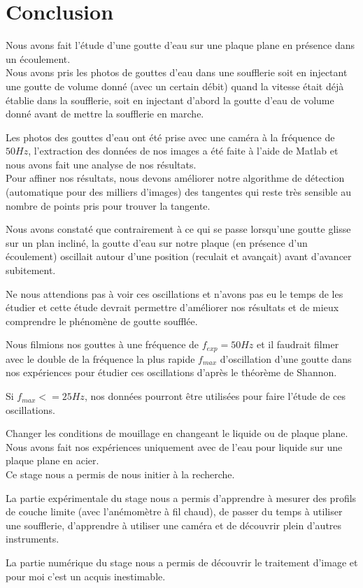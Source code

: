\section*{Conclusion}

Nous avons fait l'étude d'une goutte d'eau sur une plaque plane en présence dans un écoulement.\\

Nous avons pris les photos de gouttes d'eau dans une soufflerie soit en injectant une goutte de volume donné (avec un certain débit) quand la vitesse était déjà établie dans la soufflerie, soit en injectant d'abord la goutte d'eau de volume donné avant de mettre la soufflerie en marche.

Les photos des gouttes d'eau ont été prise avec une caméra à la fréquence de $50Hz$, l'extraction des données de nos images a été faite à l'aide de Matlab et nous avons fait une analyse de nos résultats.\\


Pour affiner nos résultats, nous devons améliorer notre algorithme de détection (automatique pour des milliers d'images) des tangentes qui reste très sensible au nombre de points pris pour trouver la tangente.

Nous avons constaté que contrairement à ce qui se passe lorsqu'une goutte glisse sur un plan incliné, 
la goutte d'eau sur notre plaque (en présence d'un écoulement) oscillait autour d'une position (reculait et avançait) avant d'avancer subitement.

Ne nous attendions pas à voir ces oscillations et n'avons pas eu le temps de les étudier et cette étude devrait permettre d'améliorer nos résultats et de mieux comprendre le phénomène de goutte soufflée.

Nous filmions nos gouttes à une fréquence de $f_{exp} = 50Hz$ et il faudrait filmer avec le double de la fréquence la plus rapide $f_{max}$ d'oscillation d'une goutte dans nos expériences  pour étudier ces oscillations d'après le théorème de Shannon.

Si $f_{max} <= 25 Hz$, nos données pourront être utilisées pour faire l'étude de ces oscillations.


Changer les conditions de mouillage en changeant le liquide ou de plaque plane. Nous avons fait nos expériences uniquement avec de l'eau pour liquide sur une plaque plane en acier. \\

Ce stage nous a permis de nous initier à la recherche.

La partie expérimentale du stage nous a  permis d'apprendre à mesurer des profils de couche limite (avec l'anémomètre à fil chaud), de passer du temps à utiliser une soufflerie, d'apprendre à utiliser une caméra et de découvrir plein d'autres instruments.

La partie numérique du stage nous a permis de découvrir le traitement d'image et pour moi c'est un acquis inestimable.